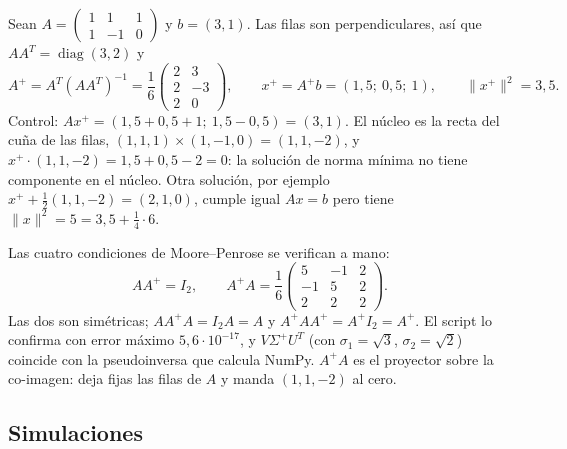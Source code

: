\begin{ejemplo}\label{ej:norma-minima}
Sean \(A=\begin{pmatrix}1&1&1\\1&-1&0\end{pmatrix}\) y \(b=(3,1)\). Las filas son
perpendiculares, así que \(AA^T=\operatorname{diag}(3,2)\) y
\[
  A^{+}=A^T(AA^T)^{-1}=\frac16\begin{pmatrix}2&3\\2&-3\\2&0\end{pmatrix},\qquad
  x^{+}=A^{+}b=(1{,}5;\ 0{,}5;\ 1),\qquad \lVert x^{+}\rVert^2=3{,}5 .
\]
Control: \(Ax^{+}=(1{,}5+0{,}5+1;\ 1{,}5-0{,}5)=(3,1)\). El núcleo es la recta del cuña de
las filas, \((1,1,1)\times(1,-1,0)=(1,1,-2)\), y \(x^{+}\cdot(1,1,-2)=1{,}5+0{,}5-2=0\): la
solución de norma mínima no tiene componente en el núcleo. Otra solución, por ejemplo
\(x^{+}+\tfrac12(1,1,-2)=(2,1,0)\), cumple igual \(Ax=b\) pero tiene
\(\lVert x\rVert^2=5=3{,}5+\tfrac14\cdot6\).

Las cuatro condiciones de Moore--Penrose se verifican a mano:
\[
  AA^{+}=I_2,\qquad
  A^{+}A=\frac16\begin{pmatrix}5&-1&2\\-1&5&2\\2&2&2\end{pmatrix}.
\]
Las dos son simétricas; \(AA^{+}A=I_2A=A\) y \(A^{+}AA^{+}=A^{+}I_2=A^{+}\). El script
lo confirma con error máximo \(5{,}6\cdot10^{-17}\), y \(V\Sigma^{+}U^T\) (con
\(\sigma_1=\sqrt3\), \(\sigma_2=\sqrt2\)) coincide con la pseudoinversa que calcula NumPy.
\(A^{+}A\) es el proyector sobre la co-imagen: deja fijas las filas de \(A\) y manda
\((1,1,-2)\) al cero.
\end{ejemplo}

\subsection{Simulaciones}



